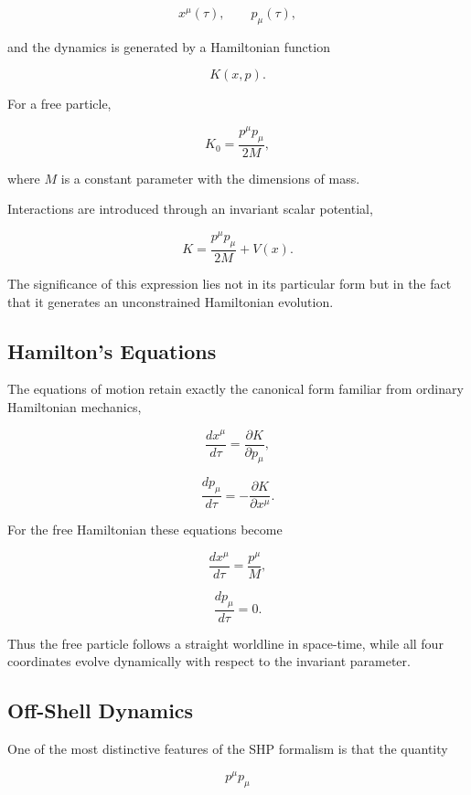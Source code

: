 \[
x^\mu(\tau),
\qquad
p_\mu(\tau),
\]

and the dynamics is generated by a Hamiltonian function

\[
K(x,p).
\]

For a free particle,

\[
\boxed{
K_0
=
\frac{p^\mu p_\mu}{2M},
}
\]

where \(M\) is a constant parameter with the dimensions of mass.

Interactions are introduced through an invariant scalar potential,

\[
K
=
\frac{p^\mu p_\mu}{2M}
+
V(x).
\]

The significance of this expression lies not in its particular form but
in the fact that it generates an unconstrained Hamiltonian evolution.

\subsection{Hamilton's Equations}

The equations of motion retain exactly the canonical form familiar from
ordinary Hamiltonian mechanics,

\[
\boxed{
\frac{dx^\mu}{d\tau}
=
\frac{\partial K}{\partial p_\mu},
}
\]

\[
\boxed{
\frac{dp_\mu}{d\tau}
=
-
\frac{\partial K}{\partial x^\mu}.
}
\]

For the free Hamiltonian these equations become

\[
\frac{dx^\mu}{d\tau}
=
\frac{p^\mu}{M},
\]

\[
\frac{dp_\mu}{d\tau}
=
0.
\]

Thus the free particle follows a straight worldline in space-time, while
all four coordinates evolve dynamically with respect to the invariant
parameter.

\subsection{Off-Shell Dynamics}

One of the most distinctive features of the SHP formalism is that the
quantity

\[
p^\mu p_\mu
\]

